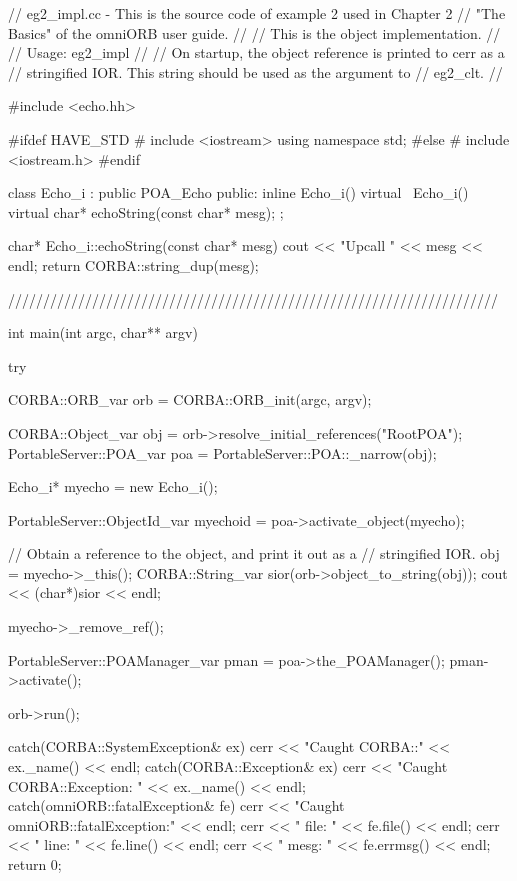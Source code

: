 \documentclass[11pt,twoside,a4paper]{book}
\begin{document}
\begin{cxxlisting}
// eg2_impl.cc - This is the source code of example 2 used in Chapter 2
//               "The Basics" of the omniORB user guide.
//
//               This is the object implementation.
//
// Usage: eg2_impl
//
//        On startup, the object reference is printed to cerr as a
//        stringified IOR. This string should be used as the argument to 
//        eg2_clt.
//

#include <echo.hh>

#ifdef HAVE_STD
#  include <iostream>
   using namespace std;
#else
#  include <iostream.h>
#endif

class Echo_i : public POA_Echo
{
public:
  inline Echo_i() {}
  virtual ~Echo_i() {}
  virtual char* echoString(const char* mesg);
};


char* Echo_i::echoString(const char* mesg)
{
  cout << "Upcall " << mesg << endl;
  return CORBA::string_dup(mesg);
}

//////////////////////////////////////////////////////////////////////

int main(int argc, char** argv)
{
  try {
    CORBA::ORB_var orb = CORBA::ORB_init(argc, argv);

    CORBA::Object_var obj = orb->resolve_initial_references("RootPOA");
    PortableServer::POA_var poa = PortableServer::POA::_narrow(obj);

    Echo_i* myecho = new Echo_i();
      
    PortableServer::ObjectId_var myechoid = poa->activate_object(myecho);

    // Obtain a reference to the object, and print it out as a
    // stringified IOR.
    obj = myecho->_this();
    CORBA::String_var sior(orb->object_to_string(obj));
    cout << (char*)sior << endl;

    myecho->_remove_ref();

    PortableServer::POAManager_var pman = poa->the_POAManager();
    pman->activate();

    orb->run();
  }
  catch(CORBA::SystemException& ex) {
    cerr << "Caught CORBA::" << ex._name() << endl;
  }
  catch(CORBA::Exception& ex) {
    cerr << "Caught CORBA::Exception: " << ex._name() << endl;
  }
  catch(omniORB::fatalException& fe) {
    cerr << "Caught omniORB::fatalException:" << endl;
    cerr << "  file: " << fe.file() << endl;
    cerr << "  line: " << fe.line() << endl;
    cerr << "  mesg: " << fe.errmsg() << endl;
  }
  return 0;
}
\end{cxxlisting}
\end{document}
